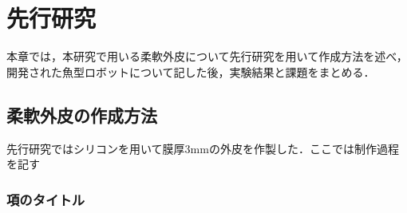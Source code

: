 \newpage
\section{先行研究}
本章では，本研究で用いる柔軟外皮について先行研究を用いて作成方法を述べ，開発された魚型ロボットについて記した後，実験結果と課題をまとめる．
\subsection{柔軟外皮の作成方法}
先行研究ではシリコンを用いて膜厚3mmの外皮を作製した．ここでは制作過程を記す
\subsubsection{項のタイトル}
